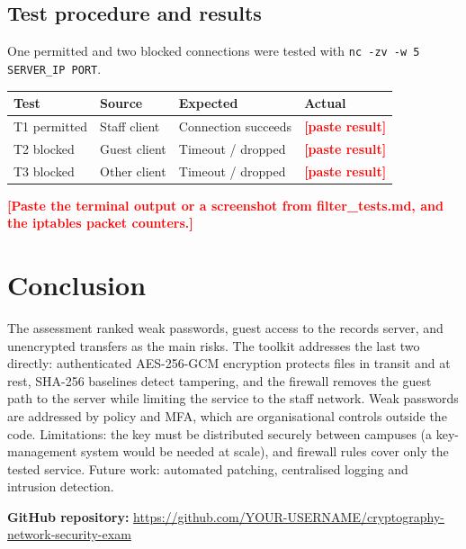 \documentclass[11pt,a4paper]{article}
\newcommand{\todo}[1]{\textcolor{red}{\textbf{[#1]}}}
\newcommand{\repourl}{\url{https://github.com/YOUR-USERNAME/cryptography-network-security-exam}}
\begin{document}
\subsection{Test procedure and results}
One permitted and two blocked connections were tested with \texttt{nc -zv -w 5 SERVER\_IP PORT}.
\begin{center}
\begin{tabular}{@{}llp{3.3cm}p{3.6cm}@{}}
\toprule
Test & Source & Expected & Actual\\ \midrule
T1 permitted & Staff client & Connection succeeds & \todo{paste result}\\
T2 blocked & Guest client & Timeout / dropped & \todo{paste result}\\
T3 blocked & Other client & Timeout / dropped & \todo{paste result}\\ \bottomrule
\end{tabular}
\end{center}
\todo{Paste the terminal output or a screenshot from filter\_tests.md, and the iptables packet counters.}

\section{Conclusion}\label{sec:conclusion}
The assessment ranked weak passwords, guest access to the records server, and unencrypted transfers as the main risks.
The toolkit addresses the last two directly: authenticated AES-256-GCM encryption protects files in transit and at rest, SHA-256
baselines detect tampering, and the firewall removes the guest path to the server while limiting the service to the staff
network. Weak passwords are addressed by policy and MFA, which are organisational controls outside the code. Limitations: the key must
be distributed securely between campuses (a key-management system would be needed at scale), and firewall rules cover only
the tested service. Future work: automated patching, centralised logging and intrusion detection.

\medskip
\noindent\textbf{GitHub repository:} \repourl
\end{document}
